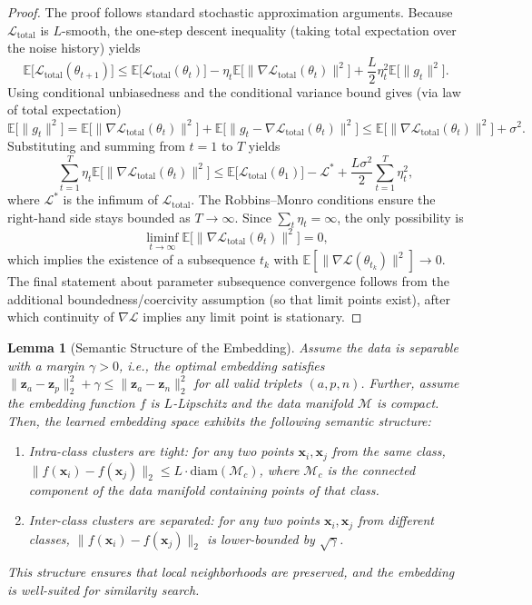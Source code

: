 \documentclass[a4paper,12pt,reqno]{amsart}
\newtheorem{lemma}[theorem]{\textbf{Lemma} }
\theoremstyle{definition}
\theoremstyle{remark}
\begin{document}
\begin{proof}
	The proof follows standard stochastic approximation arguments. Because $\mathcal{L}_{\text{total}}$ is $L$-smooth, the one-step descent inequality (taking total expectation over the noise history) yields
	\[
	\mathbb{E}\big[\mathcal{L}_{\text{total}}(\theta_{t+1})\big] 
	\leq \mathbb{E}\big[\mathcal{L}_{\text{total}}(\theta_t)\big] 
	- \eta_t \mathbb{E}\big[\|\nabla \mathcal{L}_{\text{total}}(\theta_t)\|^2\big] 
	+ \frac{L}{2}\eta_t^2 \mathbb{E}\big[\|g_t\|^2\big].
	\]
	Using conditional unbiasedness and the conditional variance bound gives (via law of total expectation)
	\[
	\mathbb{E}\big[\|g_t\|^2\big] 
	= \mathbb{E}\big[\|\nabla \mathcal{L}_{\text{total}}(\theta_t)\|^2\big] 
	+ \mathbb{E}\big[\|g_t - \nabla \mathcal{L}_{\text{total}}(\theta_t)\|^2\big]
	\le \mathbb{E}\big[\|\nabla \mathcal{L}_{\text{total}}(\theta_t)\|^2\big] + \sigma^2.
	\]
	Substituting and summing from $t=1$ to $T$ yields
	\[
	\sum_{t=1}^T \eta_t \mathbb{E}\big[\|\nabla \mathcal{L}_{\text{total}}(\theta_t)\|^2\big] 
	\leq \mathbb{E}\big[\mathcal{L}_{\text{total}}(\theta_1)\big] - \mathcal{L}^* 
	+ \frac{L\sigma^2}{2}\sum_{t=1}^T \eta_t^2,
	\]
	where $\mathcal{L}^*$ is the infimum of $\mathcal{L}_{\text{total}}$. The Robbins--Monro conditions ensure the right-hand side stays bounded as $T\to\infty$. Since $\sum_t\eta_t=\infty$, the only possibility is
	\[
	\liminf_{t\to\infty}\mathbb{E}\big[\|\nabla \mathcal{L}_{\text{total}}(\theta_t)\|^2\big]=0,
	\]
	which implies the existence of a subsequence $t_k$ with \(\mathbb{E}[\|\nabla \mathcal{L}(\theta_{t_k})\|^2]\to 0\). The final statement about parameter subsequence convergence follows from the additional boundedness/coercivity assumption (so that limit points exist), after which continuity of $\nabla\mathcal{L}$ implies any limit point is stationary.
\end{proof}

\begin{lemma}[Semantic Structure of the Embedding]
	\label{lemma:structure}
	Assume the data is separable with a margin $\gamma > 0$, i.e., the optimal embedding satisfies $\|\mathbf{z}_a - \mathbf{z}_p\|_2^2 + \gamma \leq \|\mathbf{z}_a - \mathbf{z}_n\|_2^2$ for all valid triplets $(a, p, n)$. Further, assume the embedding function $f$ is $L$-Lipschitz and the data manifold $\mathcal{M}$ is compact. Then, the learned embedding space exhibits the following semantic structure:
	\begin{enumerate}
		\item[(i)] Intra-class clusters are tight: for any two points $\mathbf{x}_i, \mathbf{x}_j$ from the same class, $\|f(\mathbf{x}_i) - f(\mathbf{x}_j)\|_2 \leq L \cdot \text{diam}(\mathcal{M}_c)$, where $\mathcal{M}_c$ is the connected component of the data manifold containing points of that class.
		\item[(ii)] Inter-class clusters are separated: for any two points $\mathbf{x}_i, \mathbf{x}_j$ from different classes, $\|f(\mathbf{x}_i) - f(\mathbf{x}_j)\|_2$ is lower-bounded by $\sqrt{\gamma}$.
	\end{enumerate}
	This structure ensures that local neighborhoods are preserved, and the embedding is well-suited for similarity search.
\end{lemma}
\end{document}
